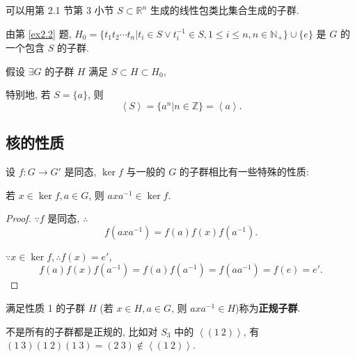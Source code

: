 \documentclass{ctexart}
\begin{document}
可以用第 2.1 节第 3 小节 $S\subset\mathbb{R}^n$ 生成的线性包类比集合生成的子群.

由第 \ref{ex2.2} 题, $H_0=\{t_1t_2\cdots t_n|t_i\in S\vee t_i^{-1}\in S,1\leq i\leq n,n\in\mathbb{N}_+\}\cup\{e\}$ 是 $G$ 的一个包含 $S$ 的子群.

假设 $\exists G$ 的子群 $H$ 满足 $S\subset H\subset H_0$,

特别地, 若 $S=\{a\}$, 则
\[\left<S\right>=\{a^n|n\in\mathbb{Z}\}=\left<a\right>.\]
\subsection{核的性质}
设 $f:G\to G'$ 是同态, $\ker f$ 与一般的 $G$ 的子群相比有一些特殊的性质:
\begin{property}
    若 $x\in\ker f,a\in G$, 则 $axa^{-1}\in\ker f$.
\end{property}
\begin{proof}
    $\because f$ 是同态, $\therefore$
    \[f(axa^{-1})=f(a)f(x)f(a^{-1}).\]

    $\because x\in\ker f,\therefore f(x)=e'$,
    \[f(a)f(x)f(a^{-1})=f(a)f(a^{-1})=f(aa^{-1})=f(e)=e'.\]
\end{proof}
满足性质 1 的子群 $H$ (若 $x\in H,a\in G$, 则 $axa^{-1}\in H$)称为\textbf{正规子群}.

不是所有的子群都是正规的, 比如对 $S_3$ 中的 $\left<(1\ 2)\right>$, 有 $(1\ 3)(1\ 2)(1\ 3)=(2\ 3)\notin\left<(1\ 2)\right>$.
\end{document}
